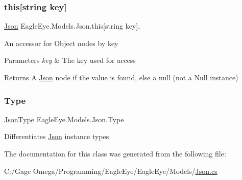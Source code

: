 \subsubsection{\texorpdfstring{this[string key]}{this[string key]}}
{\footnotesize\ttfamily \mbox{\hyperlink{class_eagle_eye_1_1_models_1_1_json}{Json}} Eagle\+Eye.\+Models.\+Json.\+this\mbox{[}string key\mbox{]}\hspace{0.3cm}{\ttfamily [get]}, {\ttfamily [set]}}



An accessor for Object nodes by key 


\begin{DoxyParams}{Parameters}
{\em key} & The key used for access\\
\hline
\end{DoxyParams}
\begin{DoxyReturn}{Returns}
A \mbox{\hyperlink{class_eagle_eye_1_1_models_1_1_json}{Json}} node if the value is found, else a null (not a Null instance) 
\end{DoxyReturn}
\mbox{\label{class_eagle_eye_1_1_models_1_1_json_a8b9b9f8ed1df50c3d00d2bd7cbbd9e46}} 
\subsubsection{\texorpdfstring{Type}{Type}}
{\footnotesize\ttfamily \mbox{\hyperlink{class_eagle_eye_1_1_models_1_1_json_afdf0e16163f8b9bab5b45d6d01e8133c}{Json\+Type}} Eagle\+Eye.\+Models.\+Json.\+Type\hspace{0.3cm}{\ttfamily [get]}}



Differentiates \mbox{\hyperlink{class_eagle_eye_1_1_models_1_1_json}{Json}} instance types 



The documentation for this class was generated from the following file\+:\begin{DoxyCompactItemize}
\item 
C\+:/\+Gage Omega/\+Programming/\+Eagle\+Eye/\+Eagle\+Eye/\+Models/\mbox{\hyperlink{_json_8cs}{Json.\+cs}}\end{DoxyCompactItemize}
